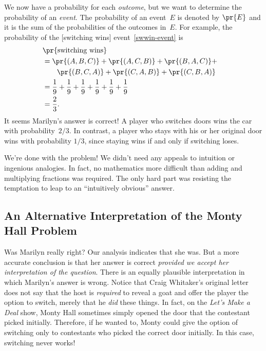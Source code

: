 We now have a probability for each \emph{outcome}, but we want to
determine the probability of an \emph{event}.  The probability of an
event~$E$ is denoted by $\pr{E}$ and it is the sum of the
probabilities of the outcomes in~$E$.  For example, the probability of
the [switching wins] event~\eqref{swwin-event} is
\begin{align*}
\lefteqn{\pr{\text{switching wins}}}\\
    & = \pr{(A, B, C)} + \pr{(A, C, B)} + \pr{(B, A, C)} + \\
    & \qquad \pr{(B, C, A)} + \pr{(C, A, B)} + \pr{(C, B, A)} \\
    & = \frac{1}{9} + \frac{1}{9} + \frac{1}{9} +
        \frac{1}{9} + \frac{1}{9} + \frac{1}{9} \\
    & = \frac{2}{3}.
\end{align*}
It seems Marilyn's answer is correct!  A player who switches doors
wins the car with probability~$2/3$.  In contrast, a player who stays
with his or her original door wins with probability $1/3$, since
staying wins if and only if switching loses.

We're done with the problem!  We didn't need any appeals to intuition
or ingenious analogies.  In fact, no mathematics more difficult than
adding and multiplying fractions was required.  The only hard part was
resisting the temptation to leap to an ``intuitively obvious'' answer.

\subsection{An Alternative Interpretation of the Monty Hall Problem}

Was Marilyn really right?  Our analysis indicates that she was.  But a
more accurate conclusion is that her answer is correct \emph{provided
  we accept her interpretation of the question}.  There is an equally
plausible interpretation in which Marilyn's answer is wrong.  Notice
that Craig Whitaker's original letter does not say that the host is
\emph{required} to reveal a goat and offer the player the option to
switch, merely that he \emph{did} these things.  In fact, on the
\emph{Let's Make a Deal} show, Monty Hall sometimes simply opened the
door that the contestant picked initially.  Therefore, if he wanted
to, Monty could give the option of switching only to contestants who
picked the correct door initially.  In this case, switching never
works!


